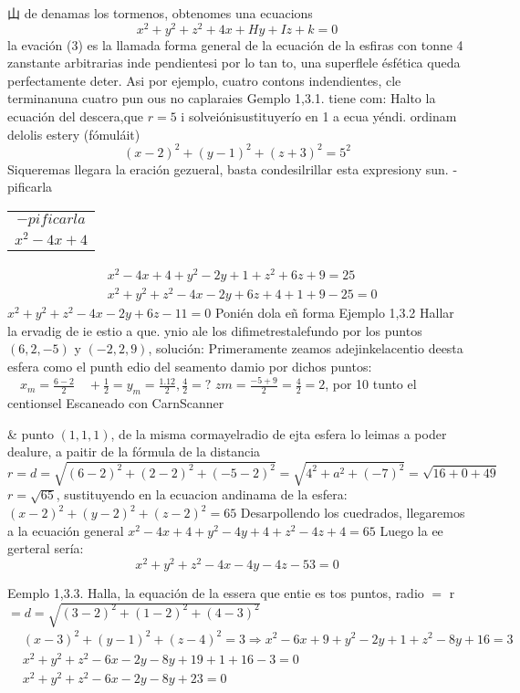 

山
de denamas los tormenos, obtenomes una ecuacions
$$
x^2+y^2+z^2+4 x+H y+I z+k=0
$$
la evación (3) es la llamada forma general de la ecuación de la esfiras con tonne 4 zanstante arbitrarias inde pendientesi por lo tan to, una superflele ésfética queda perfectamente deter. Asi por ejemplo, cuatro contons indendientes, cle terminanuna cuatro pun ous no caplaraies Gemplo 1,3.1.
tiene com: Halto la ecuación del descera,que $r=5$ i solveiónisustituyerío en 1 a ecua yéndi. ordinam delolis estery (fómuláit)
$$
(x-2)^2+(y-1)^2+(z+3)^2=5^2
$$
Siqueremas llegara la eración gezueral,
basta condesilrillar esta expresiony sun.
-pificarla \begin{tabular}{c}
	$-p i f i c a r l a$ \\
	$x^2-4 x+4$ \\
	\hline
\end{tabular}
$$
\begin{aligned}
	& x^2-4 x+4+y^2-2 y+1+z^2+6 z+9=25 \\
	& x^2+y^2+z^2-4 x-2 y+6 z+4+1+9-25=0
\end{aligned}
$$
$x^2+y^2+z^2-4 x-2 y+6 z-11=0$ Ponién dola eñ forma Ejemplo 1,3.2 Hallar la ervadig de ie estio a que. ynio ale los difimetrestalefundo por los puntos $(6,2,-5)$ y $(-2,2,9)$, solución:
Primeramente zeamos adejinkelacentio deesta esfera como el punth edio del seamento damio por dichos puntos: $\quad x_m=\frac{6-2}{2} \quad+\frac{1}{2}=y_m=\frac{1.12}{2}, \frac{4}{2}=?$ $z m=\frac{-5+9}{2}=\frac{4}{2}=2$, por 10 tunto el centionsel
Escaneado con CarnScanner




\&
punto $(1,1,1)$, de la misma cormayelradio de ejta esfera lo leimas a poder dealure, a paitir de la fórmula de la distancia
$$
r=d=\sqrt{(6-2)^2+(2-2)^2+(-5-2)^2}=\sqrt{4^2+a^2+(-7)^2}=\sqrt{16+0+49}
$$
$r=\sqrt{65}$, sustituyendo en la ecuacion andinama de la esfera: $(x-2)^2+(y-2)^2+(z-2)^2=65$
Desarpollendo los cuedrados, llegaremos a la ecuación general $x^2-4 x+4+y^2-4 y+4+z^2-4 z+4=65$ Luego la ee gerteral sería:
$$
x^2+y^2+z^2-4 x-4 y-4 z-53=0
$$

Eemplo 1,3.3. Halla, la equación de la essera que entie es tos puntos, radio $=$ r $=d=\sqrt{(3-2)^2+(1-2)^2+(4-3)^2}$
$$
\begin{aligned}
	& (x-3)^2+(y-1)^2+(z-4)^2=3 \Rightarrow x^2-6 x+9+y^2-2 y+1+z^2-8 y+16=3 \\
	& x^2+y^2+z^2-6 x-2 y-8 y+19+1+16-3=0 \\
	& x^2+y^2+z^2-6 x-2 y-8 y+23=0
\end{aligned}
$$

